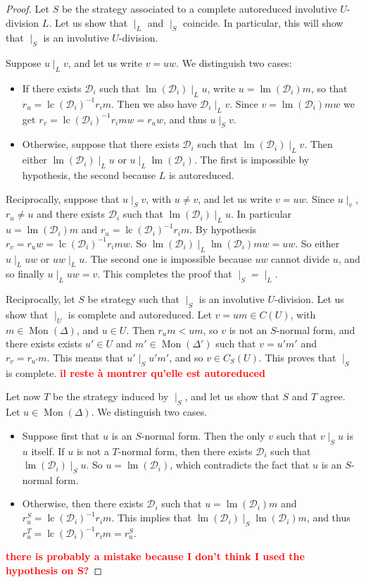 \documentclass[10pt]{easychair}
\theoremstyle{definition}
\newcommand\todo[1]{{\bf\textcolor{red}{#1}}}
\newcommand\D{\mathcal{D}}
\DeclareMathOperator{\lm}{lm}
\DeclareMathOperator{\lc}{lc}
\DeclareMathOperator{\Mon}{Mon}
\newcommand\divInv[1]{\mid_{#1}}
\begin{document}
\begin{proof}
  Let $S$ be the strategy associated to a complete autoreduced involutive
  $U$-division $L$. Let us show that $\divInv L$ and $\divInv S$ coincide. In
  particular, this will show that $\divInv S$ is an involutive $U$-division.

  Suppose $u \divInv L v$, and let us write $v = uw$. We distinguish two cases:
  \begin{itemize}
  \item If there exists $\D_i$ such that $\lm(\D_i) \divInv L u$, write
    $u = \lm(\D_i)m$, so that $r_u = \lc(\D_i)^{-1} r_i m$. Then we also have
    $\D_i \divInv L v$. Since $v = \lm(\D_i)mw$ we get
    $r_v = \lc(\D_i)^{-1} r_i m w = r_u w$, and thus $u \divInv S v$.
  \item Otherwise, suppose that there exists $\D_i$ such that
    $\lm(\D_i) \divInv L v$. Then either $\lm(\D_i) \divInv L u$ or
    $u \divInv L \lm(\D_i)$.  The first is impossible by hypothesis, the second
    because $L$ is autoreduced.
  \end{itemize}

  Reciprocally, suppose that $u \divInv S v$, with $u \neq v$, and let us write
  $v = uw$. Since $u \divInv v$, $r_u \neq u$ and there exists $\D_i$ such that
  $\lm(\D_i) \divInv L u$. In particular $u = \lm(\D_i)m$ and
  $r_u = \lc(\D_i)^{-1} r_i m$. By hypothesis
  $r_v = r_u w = \lc(\D_i)^{-1} r_i m w$. So
  $\lm(\D_i) \divInv L \lm(\D_i)mw = uw$. So either $u \divInv L uw$ or
  $uw \divInv L u$. The second one is impossible because $uw$ cannot divide $u$,
  and so finally $u \divInv L uw = v$. This completes the proof that
  $\divInv{S} = \divInv{L}$.


  Reciprocally, let $S$ be strategy such that $\divInv{S}$ is an involutive
  $U$-division. Let us show that $\divInv{U}$ is complete and autoreduced. Let
  $v = um \in C(U)$, with $m \in \Mon(\Delta)$, and $u \in U$. Then $r_um < um$, so
  $v$ is not an $S$-normal form, and there exists exists $u' \in U$ and
  $m' \in \Mon(\Delta')$ such that $v = u'm'$ and $r_{v} = r_{u'}m$. This means that
  $u' \divInv S u'm'$, and so $v \in C_S(U)$. This proves that $\divInv S$ is
  complete. \todo{il reste à montrer qu'elle est autoreduced}

  Let now $T$ be the strategy induced by $\divInv S$, and let us show that $S$
  and $T$ agree. Let $u \in \Mon(\Delta)$. We distinguish two cases.
  \begin{itemize}
  \item Suppose first that $u$ is an $S$-normal form. Then the only $v$ such
    that $v \divInv S u$ is $u$ itself. If $u$ is not a $T$-normal form, then
    there exists $\D_i$ such that $\lm(\D_i) \divInv S u$. So $u = \lm(\D_i)$,
    which contradicts the fact that $u$ is an $S$-normal form.
  \item Otherwise, then there exists $\D_i$ such that $u = \lm(\D_i) m$ and
    $r^S_u = \lc(\D_i)^{-1} r_i m$. This implies that
    $\lm(\D_i) \divInv S \lm(\D_i)m$, and thus
    $r^T_u = \lc(\D_i)^{-1} r_i m = r^S_u$.
  \end{itemize}
  

  \todo{there is probably a mistake because I don't think I used the hypothesis on S?}
  
\end{proof}
\end{document}
